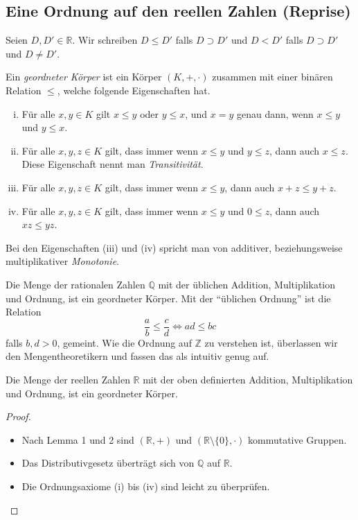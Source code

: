 \documentclass[../main.tex]{subfiles}
\begin{document}
\subsection*{Eine Ordnung auf den reellen Zahlen (Reprise)}
\begin{definition}
  Seien $D, D' \in \mathbb R$. Wir schreiben $D \leq D'$ falls
  $D \supset D'$ und $D < D'$ falls $D \supset D'$ und $D \neq D'$.
\end{definition}

\begin{definition}
  Ein \emph{geordneter Körper} ist ein Körper $(K, +, \cdot)$
  zusammen mit einer binären Relation $\leq$, welche folgende
  Eigenschaften hat.
  \begin{enumerate}[(i)]
    \item Für alle $x, y \in K$ gilt $x \leq y$ oder $y \leq x$,
      und $x = y$ genau dann, wenn $x \leq y$ und $y \leq x$.
    \item Für alle $x, y, z \in K$ gilt, dass immer wenn
      $x \leq y$ und $y \leq z$, dann auch $x \leq z$. Diese
      Eigenschaft nennt man \emph{Transitivität}.
    \item Für alle $x, y, z \in K$ gilt, dass immer wenn
      $x \leq y$, dann auch $x + z \leq y + z$.
    \item Für alle $x, y, z \in K$ gilt, dass immer wenn
      $x \leq y$ und $0 \leq z$, dann auch $xz \leq yz$.
  \end{enumerate}
  Bei den Eigenschaften (iii) und (iv) spricht man von additiver,
  beziehungsweise multiplikativer \emph{Monotonie}.
\end{definition}

\begin{example}
  Die Menge der rationalen Zahlen $\mathbb Q$ mit der üblichen
  Addition, Multiplikation und Ordnung, ist ein geordneter Körper.
  Mit der ``üblichen Ordnung'' ist die Relation
  \[ \frac{a}{b} \leq \frac{c}{d} \Leftrightarrow ad \leq bc\]
  falls $b, d > 0$, gemeint.
  Wie die Ordnung auf $\mathbb Z$ zu verstehen ist, überlassen
  wir den Mengentheoretikern und fassen das als intuitiv genug auf.
\end{example}

\begin{manualtheorem}{1}
  Die Menge der reellen Zahlen $\mathbb R$ mit der oben definierten
  Addition, Multiplikation und Ordnung, ist ein geordneter Körper.
\end{manualtheorem}

\begin{proof}
  \leavevmode
  \begin{itemize}
    \item Nach Lemma 1 und 2 sind $(\mathbb R, +)$ und
      $(\mathbb R \setminus \{0\}, \cdot)$ kommutative Gruppen.
    \item Das Distributivgesetz überträgt sich von $\mathbb Q$
      auf $\mathbb R$.
    \item Die Ordnungsaxiome (i) bis (iv) sind leicht zu überprüfen.
      \qedhere
  \end{itemize}
\end{proof}
\end{document}
